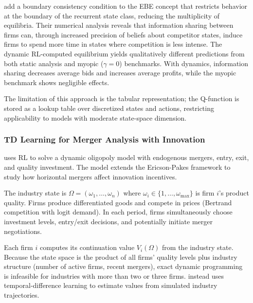 \citet{AskerEtAl2020} add a boundary consistency condition to the EBE concept that restricts behavior at the boundary of the recurrent state class, reducing the multiplicity of equilibria. Their numerical analysis reveals that information sharing between firms can, through increased precision of beliefs about competitor states, induce firms to spend more time in states where competition is less intense. The dynamic RL-computed equilibrium yields qualitatively different predictions from both static analysis and myopic ($\gamma = 0$) benchmarks. With dynamics, information sharing decreases average bids and increases average profits, while the myopic benchmark shows negligible effects.

The limitation of this approach is the tabular representation; the Q-function is stored as a lookup table over discretized states and actions, restricting applicability to models with moderate state-space dimension.


\subsubsection{TD Learning for Merger Analysis with Innovation}

\citet{Hollenbeck2019} uses RL to solve a dynamic oligopoly model with endogenous mergers, entry, exit, and quality investment. The model extends the Ericson-Pakes framework to study how horizontal mergers affect innovation incentives.

The industry state is $\Omega = (\omega_1, \ldots, \omega_n)$ where $\omega_i \in \{1, \ldots, \omega_{\max}\}$ is firm $i$'s product quality. Firms produce differentiated goods and compete in prices (Bertrand competition with logit demand). In each period, firms simultaneously choose investment levels, entry/exit decisions, and potentially initiate merger negotiations.

Each firm $i$ computes its continuation value $V_i(\Omega)$ from the industry state. Because the state space is the product of all firms' quality levels plus industry structure (number of active firms, recent mergers), exact dynamic programming is infeasible for industries with more than two or three firms. \citet{Hollenbeck2019} instead uses temporal-difference learning to estimate values from simulated industry trajectories.

